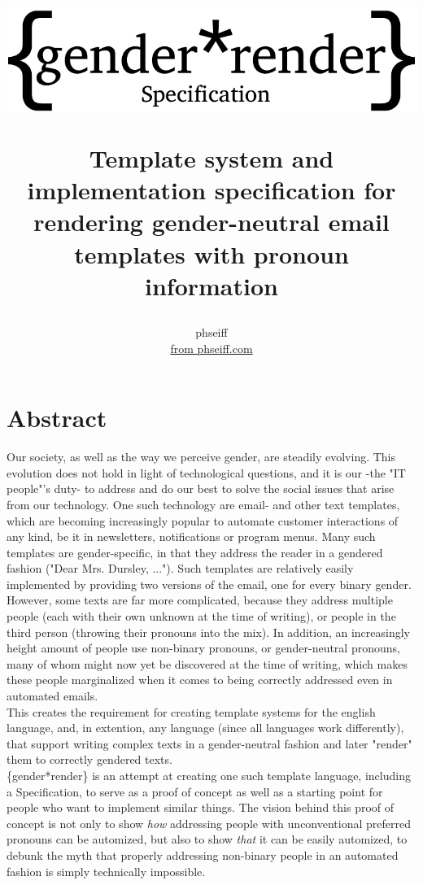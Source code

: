 \documentclass{article}
\author{phseiff\\ \href{https://phseiff.com}{from phseiff.com}}
\title{\begin{center}
           \includegraphics{images/title-black.pdf}
\end{center} Template system and implementation specification for rendering gender-neutral email templates with pronoun information}
\begin{document}
\maketitle
\tableofcontents

\section{Abstract}

    Our society, as well as the way we perceive gender, are steadily evolving.
    This evolution does not hold in light of technological questions, and it is our -the "IT people"'s duty- to address and do our best to solve the social issues that arise from our technology.
    One such technology are email- and other text templates, which are becoming increasingly popular to automate customer interactions of any kind, be it in newsletters, notifications or program menus.
    Many such templates are gender-specific, in that they address the reader in a gendered fashion ("Dear Mrs. Dursley, ...").
    Such templates are relatively easily implemented by providing two versions of the email, one for every binary gender.
    However, some texts are far more complicated, because they address multiple people (each with their own unknown at the time of writing), or people in the third person (throwing their pronouns into the mix).
    In addition, an increasingly height amount of people use non-binary pronouns, or gender-neutral pronouns, many of whom might now yet be discovered at the time of writing, which makes these people marginalized when it comes to being correctly addressed even in automated emails.\\

    This creates the requirement for creating template systems for the english language, and, in extention, any language (since all languages work differently), that support writing complex texts in a gender-neutral fashion and later "render" them to correctly gendered texts.\\

    \{gender*render\} is an attempt at creating one such template language, including a Specification, to serve as a proof of concept as well as a starting point for people who want to implement similar things.
    The vision behind this proof of concept is not only to show \emph{how} addressing people with unconventional preferred pronouns can be automized, but also to show \emph{that} it can be easily automized, to debunk the myth that properly addressing non-binary people in an automated fashion is simply technically impossible.
\end{document}
